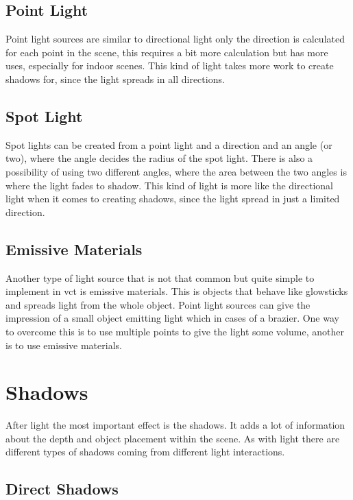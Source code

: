 \subsection{Point Light}

Point light sources are similar to directional light only the direction is calculated for each point in the scene, this requires a bit more calculation but has more uses, especially for indoor scenes. This kind of light takes more work to create shadows for, since the light spreads in all directions.

\subsection{Spot Light}

Spot lights can be created from a point light and a direction and an angle (or two), where the angle decides the radius of the spot light. There is also a possibility of using two different angles, where the area between the two angles is where the light fades to shadow. This kind of light is more like the directional light when it comes to creating shadows, since the light spread in just a limited direction.

\subsection{Emissive Materials}

Another type of light source that is not that common but quite simple to implement in \gls{vct} is emissive materials. This is objects that behave like glowsticks and spreads light from the whole object. Point light sources can give the impression of a small object emitting light which in cases of a brazier. One way to overcome this is to use multiple points to give the light some volume, another is to use emissive materials.

\section{Shadows}

After light the most important effect is the shadows. It adds a lot of information about the depth and object placement within the scene. As with light there are different types of shadows coming from different light interactions. 

\subsection{Direct Shadows}

